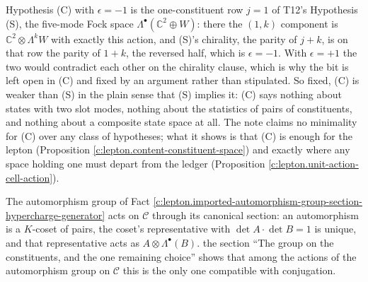 \documentclass[11pt]{article}
\theoremstyle{definition}
\theoremstyle{plain}
\providecommand{\C}{}\renewcommand{\C}{\mathbb{C}}
\providecommand{\Con}{}\renewcommand{\Con}{\mathcal{C}}
\begin{document}
Hypothesis (C) with $\epsilon = -1$ is the one-constituent row $j = 1$ of T12's Hypothesis (S), the five-mode Fock space $\Lambda^{\bullet}(\C^{2} \oplus W)$: there the $(1, k)$ component is $\C^{2} \otimes \Lambda^{k}W$ with exactly this action, and (S)'s chirality, the parity of $j + k$, is on that row the parity of $1 + k$, the reversed half, which is $\epsilon = -1$. With $\epsilon = +1$ the two would contradict each other on the chirality clause, which is why the bit is left open in (C) and fixed by an argument rather than stipulated. So fixed, (C) is weaker than (S) in the plain sense that (S) implies it: (C) says nothing about states with two slot modes, nothing about the statistics of pairs of constituents, and nothing about a composite state space at all. The note claims no minimality for (C) over any class of hypotheses; what it shows is that (C) is enough for the lepton (Proposition \ref{c:lepton.content-constituent-space}) and exactly where any space holding one must depart from the ledger (Proposition \ref{c:lepton.unit-action-cell-action}).

The automorphism group of Fact \ref{c:lepton.imported-automorphism-group-section-hypercharge-generator} acts on $\Con$ through its canonical section: an automorphism is a $K$-coset of pairs, the coset's representative with $\det A \cdot \det B = 1$ is unique, and that representative acts as $A \otimes \Lambda^{\bullet}(B)$. the section ``The group on the constituents, and the one remaining choice'' shows that among the actions of the automorphism group on $\Con$ this is the only one compatible with conjugation.
\end{document}
